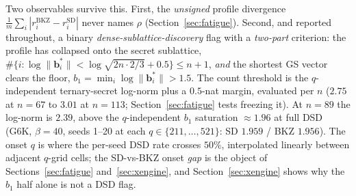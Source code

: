 \documentclass[journal=cic,version=preprint]{iacrj}
\begin{document}
Two observables survive this. First, the \emph{unsigned} profile divergence
$\frac1m\sum_i|r_i^{\mathrm{BKZ}}-r_i^{\mathrm{SD}}|$ never names $\rho$
(Section~\ref{sec:fatigue}). Second, and reported throughout, a binary
\emph{dense-sublattice-discovery} flag with a \emph{two-part} criterion: the
profile has collapsed onto the secret sublattice,
$\#\{i:\log\|\mathbf b_i^\ast\| < \log\sqrt{2n\cdot2/3}+0.5\}\le n+1$,
\emph{and} the shortest GS vector clears the floor,
$b_1=\min_i\log\|\mathbf b_i^\ast\| > 1.5$. The count threshold is the
$q$-independent ternary-secret log-norm plus a $0.5$-nat margin, evaluated per
$n$ ($2.75$ at $n=67$ to $3.01$ at $n=113$; Section~\ref{sec:fatigue} tests
freezing it). At $n=89$ the log-norm is $2.39$, above the $q$-independent
$b_1$ saturation ${\approx}1.96$ at full DSD (G6K, $\beta=40$, seeds 1--20
at each $q\in\{211,\dots,521\}$: SD $1.959$ / BKZ $1.956$). The
onset $q$ is where the per-seed DSD rate crosses $50\%$, interpolated linearly
between adjacent $q$-grid cells; the SD-vs-BKZ onset \emph{gap} is the object
of Sections~\ref{sec:fatigue} and~\ref{sec:xengine}, and
Section~\ref{sec:xengine} shows why the $b_1$ half alone is not a DSD flag.
\end{document}
